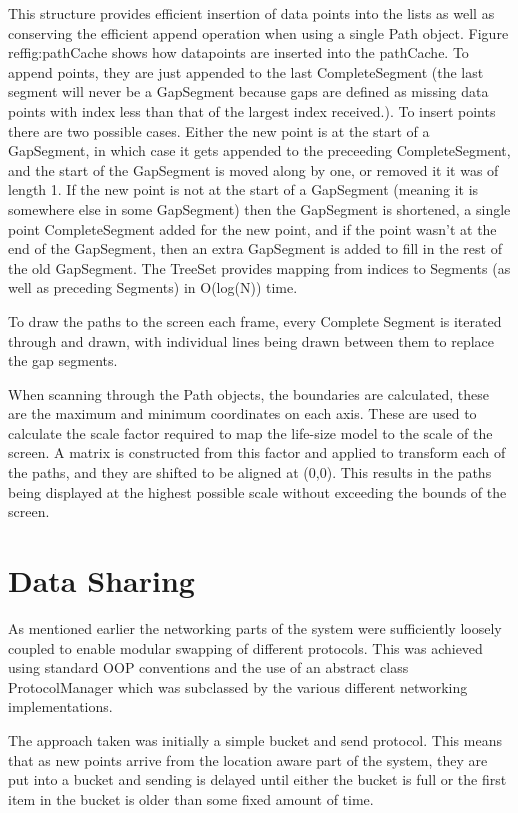This structure provides efficient insertion of data points into the lists as well as conserving the efficient append operation when using a single Path object. Figure ref{fig:pathCache} shows how datapoints are inserted into the pathCache. To append points, they are just appended to the last CompleteSegment (the last segment will never be a GapSegment because gaps are defined as missing data points with index less than that of the largest index received.). To insert points there are two possible cases. Either the new point is at the start of a GapSegment, in which case it gets appended to the preceeding CompleteSegment, and the start of the GapSegment is moved along by one, or removed it it was of length 1. If the new point is not at the start of a GapSegment (meaning it is somewhere else in some GapSegment) then the GapSegment is shortened, a single point CompleteSegment added for the new point, and if the point wasn't at the end of the GapSegment, then an extra GapSegment is added to fill in the rest of the old GapSegment. The TreeSet provides mapping from indices to Segments (as well as preceding Segments) in O(log(N)) time.

To draw the paths to the screen each frame, every Complete Segment is iterated through and drawn, with individual lines being drawn between them to replace the gap segments.

When scanning through the Path objects, the boundaries are calculated, these are the maximum and minimum coordinates on each axis. These are used to calculate the scale factor required to map the life-size model to the scale of the screen. A matrix is constructed from this factor and applied to transform each of the paths, and they are shifted to be aligned at (0,0). This results in the paths being displayed at the highest possible scale without exceeding the bounds of the screen.

\section{Data Sharing}

As mentioned earlier the networking parts of the system were sufficiently loosely coupled to enable modular swapping of different protocols. This was achieved using standard OOP conventions and the use of an abstract class ProtocolManager which was subclassed by the various different networking implementations.

The approach taken was initially a simple bucket and send protocol. This means that as new points arrive from the location aware part of the system, they are put into a bucket and sending is delayed until either the bucket is full or the first item in the bucket is older than some fixed amount of time.

